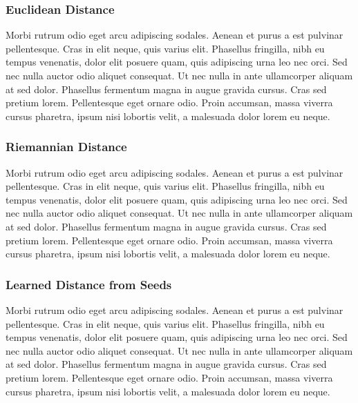 \subsubsection{Euclidean Distance}
Morbi rutrum odio eget arcu adipiscing sodales. Aenean et purus a est pulvinar pellentesque. Cras in elit neque, quis varius elit. Phasellus fringilla, nibh eu tempus venenatis, dolor elit posuere quam, quis adipiscing urna leo nec orci. Sed nec nulla auctor odio aliquet consequat. Ut nec nulla in ante ullamcorper aliquam at sed dolor. Phasellus fermentum magna in augue gravida cursus. Cras sed pretium lorem. Pellentesque eget ornare odio. Proin accumsan, massa viverra cursus pharetra, ipsum nisi lobortis velit, a malesuada dolor lorem eu neque.


\subsubsection{Riemannian Distance}
Morbi rutrum odio eget arcu adipiscing sodales. Aenean et purus a est pulvinar pellentesque. Cras in elit neque, quis varius elit. Phasellus fringilla, nibh eu tempus venenatis, dolor elit posuere quam, quis adipiscing urna leo nec orci. Sed nec nulla auctor odio aliquet consequat. Ut nec nulla in ante ullamcorper aliquam at sed dolor. Phasellus fermentum magna in augue gravida cursus. Cras sed pretium lorem. Pellentesque eget ornare odio. Proin accumsan, massa viverra cursus pharetra, ipsum nisi lobortis velit, a malesuada dolor lorem eu neque.


\subsubsection{Learned Distance from Seeds}
Morbi rutrum odio eget arcu adipiscing sodales. Aenean et purus a est pulvinar pellentesque. Cras in elit neque, quis varius elit. Phasellus fringilla, nibh eu tempus venenatis, dolor elit posuere quam, quis adipiscing urna leo nec orci. Sed nec nulla auctor odio aliquet consequat. Ut nec nulla in ante ullamcorper aliquam at sed dolor. Phasellus fermentum magna in augue gravida cursus. Cras sed pretium lorem. Pellentesque eget ornare odio. Proin accumsan, massa viverra cursus pharetra, ipsum nisi lobortis velit, a malesuada dolor lorem eu neque.

